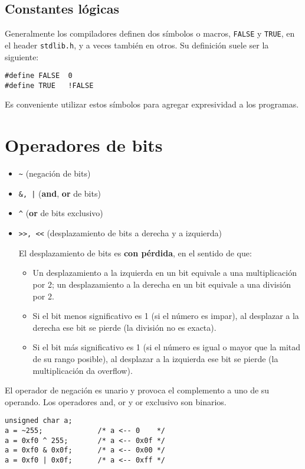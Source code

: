 \subsection{Constantes lógicas}
Generalmente los compiladores definen dos símbolos o macros, \lstinline{FALSE} y \lstinline{TRUE}, en el header \lstinline{stdlib.h}, y a veces también en otros. Su definición suele ser la siguiente:

\begin{lstlisting}
#define FALSE  0
#define TRUE   !FALSE   
\end{lstlisting}
    
Es conveniente utilizar estos símbolos para agregar expresividad a los programas.

\section{Operadores de bits}
\begin{itemize}
	\item \lstinline{~} (negación de bits)
	\item \lstinline{&, |} (\textbf{and}, \textbf{or} de bits)
	\item \lstinline{^} (\textbf{or} de bits exclusivo)
	\item \lstinline{>>, <<} (desplazamiento de bits a derecha y a izquierda)

El desplazamiento de bits es \textbf{con pérdida}, en el sentido de que:
\begin{itemize}
	\item Un desplazamiento a la izquierda en un bit equivale a una multiplicación por 2; un desplazamiento a la derecha en un bit equivale a una división por 2. 
	\item Si el bit menos significativo es 1 (si el número es impar), al desplazar a la derecha ese bit se pierde (la división no es exacta).
	\item Si el bit más significativo es 1 (si el número es igual o mayor que la mitad de su rango posible), al desplazar a la izquierda ese bit se pierde (la multiplicación da overflow).
\end{itemize}
\end{itemize}

\begin{ejemplo}
El operador de negación es unario y provoca el complemento a uno de su operando. Los operadores and, or y or exclusivo son binarios.
\begin{lstlisting}
unsigned char a;
a = ~255;             /* a <-- 0    */
a = 0xf0 ^ 255;       /* a <-- 0x0f */
a = 0xf0 & 0x0f;      /* a <-- 0x00 */
a = 0xf0 | 0x0f;      /* a <-- 0xff */                
\end{lstlisting}
\end{ejemplo}

